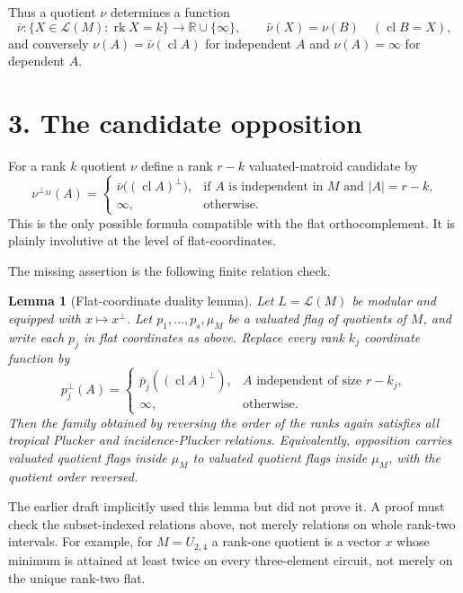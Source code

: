 \documentclass[12pt]{article}
\newcommand{\cL}{\mathcal L}
\newcommand{\rk}{\operatorname{rk}}
\newcommand{\cl}{\operatorname{cl}}
\newtheorem{lemma}{Lemma}
\begin{document}
Thus a quotient $\nu$ determines a function
\[
       \bar\nu:\{X\in\cL(M):\rk X=k\}\longrightarrow
       \mathbb R\cup\{\infty\},
       \qquad
       \bar\nu(X)=\nu(B)\quad(\cl B=X),
\]
and conversely $\nu(A)=\bar\nu(\cl A)$ for independent $A$ and
$\nu(A)=\infty$ for dependent $A$.

\section*{3. The candidate opposition}

For a rank $k$ quotient $\nu$ define a rank $r-k$ valuated-matroid
candidate by
\[
 \nu^{\perp_M}(A)=
 \begin{cases}
   \bar\nu\bigl((\cl A)^\perp\bigr),&
       \text{if $A$ is independent in $M$ and $|A|=r-k$,}\\
   \infty,&\text{otherwise.}
 \end{cases}
\]
This is the only possible formula compatible with the flat
orthocomplement.  It is plainly involutive at the level of
flat-coordinates.

The missing assertion is the following finite relation check.

\begin{lemma}[Flat-coordinate duality lemma]\label{lem:missing}
Let $L=\cL(M)$ be modular and equipped with $x\mapsto x^\perp$.  Let
$p_1,\ldots,p_s,\mu_M$ be a valuated flag of quotients of $M$, and
write each $p_j$ in flat coordinates as above.  Replace every rank
$k_j$ coordinate function by
\[
       p_j^\perp(A)=
       \begin{cases}
       \bar p_j((\cl A)^\perp),& A\text{ independent of size }r-k_j,\\
       \infty,&\text{otherwise.}
       \end{cases}
\]
Then the family obtained by reversing the order of the ranks again
satisfies all tropical Plucker and incidence-Plucker relations.
Equivalently, opposition carries valuated quotient flags inside
$\mu_M$ to valuated quotient flags inside $\mu_M$, with the quotient
order reversed.
\end{lemma}

The earlier draft implicitly used this lemma but did not prove it.  A
proof must check the subset-indexed relations above, not merely
relations on whole rank-two intervals.  For example, for
$M=U_{2,4}$ a rank-one quotient is a vector $x$ whose minimum is
attained at least twice on every three-element circuit, not merely on
the unique rank-two flat.
\end{document}
